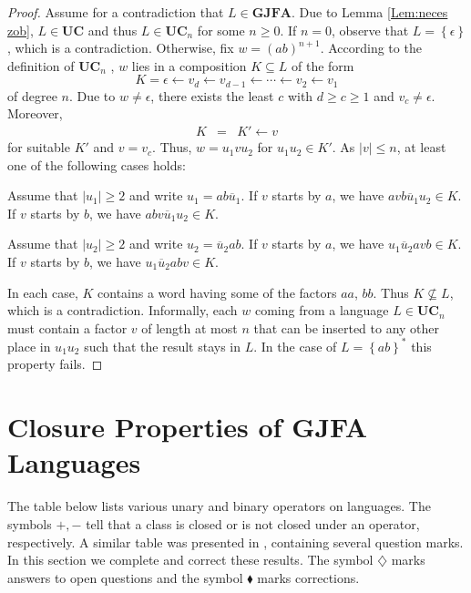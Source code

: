 \documentclass{ws-ijmpc}
\begin{document}
\begin{proof}
Assume for a contradiction that $L\in\mathbf{GJFA}$. Due to Lemma
\ref{Lem:neces zob}, $L\in\mathbf{UC}$ and thus $L\in\mathbf{UC}_{n}$
for some $n\ge0$. If $n=0$, observe that $L=\left\{ \epsilon\right\} $,
which is a contradiction. Otherwise, fix $w=\left(ab\right)^{n+1}$.
According to the definition of $\mathbf{UC}_{n}$ , $w$ lies in a
composition $K\subseteq L$ of the form
\[
K=\epsilon\leftarrow v_{d}\leftarrow v_{d-1}\leftarrow\cdots\leftarrow v_{2}\leftarrow v_{1}
\]
of degree $n$. Due to $w\neq\epsilon$, there exists the least $c$
with $d\ge c\ge1$ and $v_{c}\neq\epsilon$. Moreover,
\begin{eqnarray*}
K & = & K'\leftarrow v
\end{eqnarray*}
for suitable $K'$ and $v=v_{c}$. Thus, $w=u_{1}vu_{2}$ for $u_{1}u_{2}\in K'$.
As $\left|v\right|\le n$, at least one of the following cases holds:
\begin{romanlist}
\item Assume that $\left|u_{1}\right|\ge2$ and write $u_{1}=ab\overline{u}_{1}$.
If $v$ starts by $a$, we have $avb\overline{u}_{1}u_{2}\in K$.
If $v$ starts by $b$, we have $abv\overline{u}_{1}u_{2}\in K$.
\item Assume that $\left|u_{2}\right|\ge2$ and write $u_{2}=\overline{u}_{2}ab$.
If $v$ starts by $a$, we have $u_{1}\overline{u}_{2}avb\in K$.
If $v$ starts by $b$, we have $u_{1}\overline{u}_{2}abv\in K$.
\end{romanlist}

In each case, $K$ contains a word having some of the factors $aa$,
$bb$. Thus $K\nsubseteq L$, which is a contradiction. Informally,
each $w$ coming from a language $L\in\mathbf{UC}_{n}$ must contain
a factor $v$ of length at most $n$ that can be inserted to any other
place in $u_{1}u_{2}$ such that the result stays in $L$. In the
case of $L=\left\{ ab\right\} ^{*}$ this property fails.

\end{proof}

\section{Closure Properties of GJFA Languages}

The table below lists various unary and binary operators on languages.
The symbols $+,-$ tell that a class is closed or is not closed under
an operator, respectively. A similar table was presented in \citep{athMED1,athMED1book},
containing several question marks. In this section we complete and
correct these results. The symbol $\diamondsuit$ marks answers to
open questions and the symbol $\blacklozenge$ marks corrections.
\end{document}
